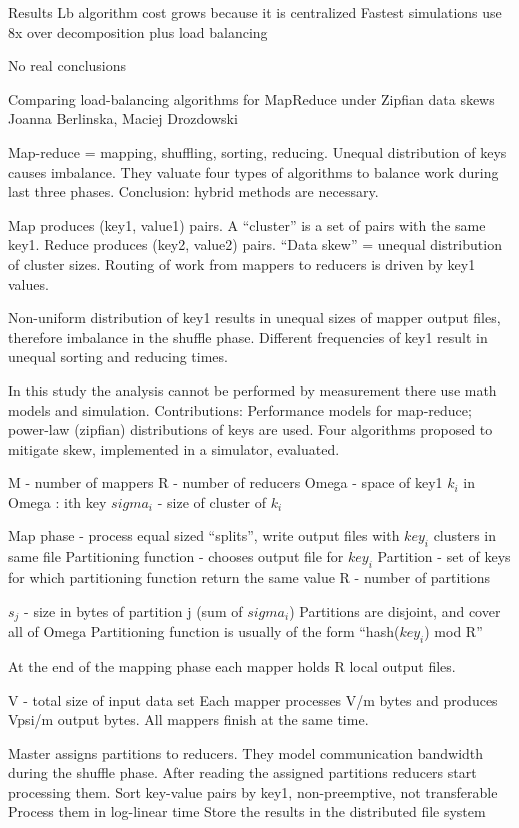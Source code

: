 \documentclass{article}
\begin{document}
Results
Lb algorithm cost grows because it is centralized
Fastest simulations use 8x over decomposition plus load balancing

No real conclusions


\cite{BERLINSKA201814}


Comparing load-balancing algorithms for MapReduce under Zipfian data skews 
Joanna Berlinska, Maciej Drozdowski 

Map-reduce = mapping, shuffling, sorting, reducing.
Unequal distribution of keys causes imbalance.
They valuate four types of algorithms to balance work during last three phases.
Conclusion: hybrid methods are necessary.

Map produces (key1, value1) pairs.
A “cluster” is a set of pairs with the same key1.
Reduce produces (key2, value2) pairs.
“Data skew” = unequal distribution of cluster sizes.
Routing of work from mappers to reducers is driven by key1 values.

Non-uniform distribution of key1 results in unequal sizes of mapper output files, therefore imbalance in the shuffle phase.
Different frequencies of key1 result in unequal sorting and reducing times.

In this study the analysis cannot be performed by measurement there use math models and simulation.
Contributions:
Performance models for map-reduce; power-law (zipfian) distributions of keys are used.
Four algorithms proposed to mitigate skew, implemented in a simulator, evaluated.

M - number of mappers
R - number of reducers
Omega - space of key1
$k_i$ in Omega : ith key
$sigma_i$ - size of cluster of $k_i$

Map phase - process equal sized “splits”, write output files with $key_i$ clusters in same file
Partitioning function - chooses output file for $key_i$
Partition - set of keys for which partitioning function return the same value
R - number of partitions

$s_j$ - size in bytes of partition j (sum of $sigma_i$)
Partitions are disjoint, and cover all of Omega
Partitioning function is usually of the form “hash($key_i$) mod R”

At the end of the mapping phase each mapper holds R local output files.

V - total size of input data set
Each mapper processes V/m bytes and produces Vpsi/m output bytes.
All mappers finish at the same time.

Master assigns partitions to reducers.
They model communication bandwidth during the shuffle phase.
After reading the assigned partitions reducers start processing them.
Sort key-value pairs by key1, non-preemptive, not transferable
Process them in log-linear time
Store the results in the distributed file system
\end{document}
